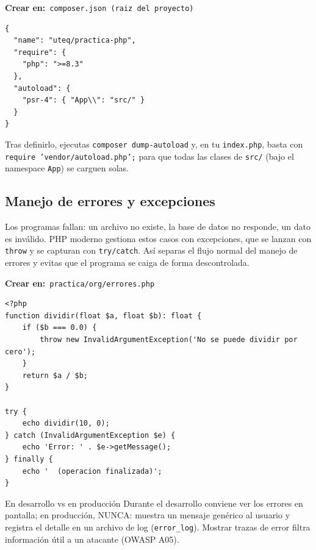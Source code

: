 \documentclass[11pt]{article}
\begin{document}
{\small\color{phpazulo}\textbf{Crear en:}~}\texttt{composer.\allowbreak{}json  (raiz del proyecto)}\par\nobreak\vspace{-1pt}
\begin{cajacodigo}
\begin{lstlisting}[style=markup]
{
  "name": "uteq/practica-php",
  "require": {
    "php": ">=8.3"
  },
  "autoload": {
    "psr-4": { "App\\": "src/" }
  }
}
\end{lstlisting}
\end{cajacodigo}
\vspace{2pt}
Tras definirlo, ejecutas \texttt{composer dump-autoload} y, en tu \texttt{index.\allowbreak{}php}, basta con \texttt{require 'vendor/\allowbreak{}autoload.\allowbreak{}php';\allowbreak{}} para que todas las clases de \texttt{src/\allowbreak{}} (bajo el namespace \texttt{App}) se carguen solas.

\subsection{Manejo de errores y excepciones}
Los programas fallan: un archivo no existe, la base de datos no responde, un dato es inválido. PHP moderno gestiona estos casos con excepciones, que se lanzan con \texttt{throw} y se capturan con \texttt{try/\allowbreak{}catch}. Así separas el flujo normal del manejo de errores y evitas que el programa se caiga de forma descontrolada.

{\small\color{phpazulo}\textbf{Crear en:}~}\texttt{practica/\allowbreak{}org/\allowbreak{}errores.\allowbreak{}php}\par\nobreak\vspace{-1pt}
\begin{cajacodigo}
\begin{lstlisting}[style=php]
<?php
function dividir(float $a, float $b): float {
    if ($b === 0.0) {
        throw new InvalidArgumentException('No se puede dividir por cero');
    }
    return $a / $b;
}

try {
    echo dividir(10, 0);
} catch (InvalidArgumentException $e) {
    echo 'Error: ' . $e->getMessage();
} finally {
    echo '  (operacion finalizada)';
}
\end{lstlisting}
\end{cajacodigo}
\vspace{2pt}
\begin{cajawarn}{En desarrollo vs en producción}
Durante el desarrollo conviene ver los errores en pantalla; en producción, NUNCA: muestra un mensaje genérico al usuario y registra el detalle en un archivo de log (\texttt{error\_log}). Mostrar trazas de error filtra información útil a un atacante (OWASP A05).\par
\end{cajawarn}
\end{document}
